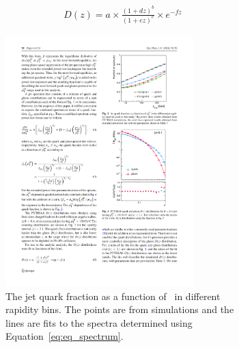 \begin{align}
D(z) = a \times \frac{(1+dz)^b}{(1+ez)^c} \times e^{-fz}
\label{eq:ff_param}
\end{align}


\begin{figure}
\begin{subfigure}{.45\textwidth}
  \centering
\includegraphics[width=0.8\textwidth]{figures/jetMeasurements/jetQuarkFraction}
\caption{The jet quark fraction as a function of \ptjet\ in different rapidity bins.
The points are from  simulations and the lines are fits to the spectra determined using Equation~\ref{eq:eq_spectrum}.}
\label{fig:eq_raa_centDep}
\end{subfigure} \qquad
\begin{subfigure}{.45\textwidth}
  \centering

\end{subfigure}
\end{figure}
